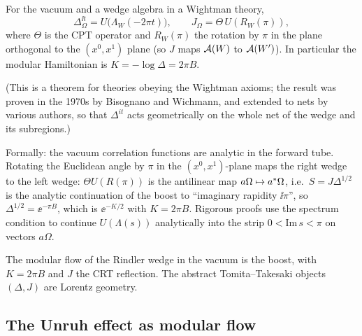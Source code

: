 \begin{theorem}\label{thm:BW}
For the vacuum and a wedge algebra in a Wightman theory,
\begin{equation}
\Delta^{\ii t}_{\Omega}=U\big(\Lambda_W(-2\pi t)\big),\qquad J_\Omega=\Theta\,U(R_W(\pi)),
\end{equation}
where $\Theta$ is the CPT operator and $R_W(\pi)$ the rotation by $\pi$ in the plane orthogonal to the $(x^0,x^1)$ plane (so $J$ maps $\mathcal{A}(W)$ to $\mathcal{A}(W')$). In particular the modular Hamiltonian is $K=-\log\Delta=2\pi B$.
\end{theorem}
(This is a theorem for theories obeying the Wightman axioms; the result was proven in the 1970s by Bisognano and Wichmann, and extended to nets by various authors, so that $\Delta^{it}$ acts geometrically on the whole net of the wedge and its subregions.)

\begin{proofsketch}
Formally: the vacuum correlation functions are analytic in the forward tube. Rotating the Euclidean angle by $\pi$ in the $(x^0,x^1)$-plane maps the right wedge to the left wedge: $\Theta U(R(\pi))$ is the antilinear map $a\Omega\mapsto a^{*}\Omega$, i.e.\ $S=J\Delta^{1/2}$ is the analytic continuation of the boost to ``imaginary rapidity $\ii\pi$'', so $\Delta^{1/2}=\ee^{-\pi B}$, which is $\ee^{-K/2}$ with $K=2\pi B$. Rigorous proofs use the spectrum condition to continue $U(\Lambda(s))$ analytically into the strip $0<\mathrm{Im}\,s<\pi$ on vectors $a\Omega$.
\end{proofsketch}

\begin{keyidea}
The modular flow of the Rindler wedge in the vacuum is the boost, with $K=2\pi B$ and $J$ the CRT reflection. The abstract Tomita--Takesaki objects $(\Delta,J)$ are Lorentz geometry.
\end{keyidea}

\subsection{The Unruh effect as modular flow}

